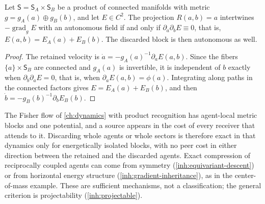 Let $\mathsf S=\mathsf S_A\times\mathsf S_B$ be a product of connected
manifolds with metric $g=g_A(a)\oplus g_B(b)$, and let $E\in C^2$. The
projection $R(a,b)=a$ intertwines $-\operatorname{grad}_gE$ with an
autonomous field if and only if $\partial_a\partial_bE\equiv0$, that is,
$E(a,b)=E_A(a)+E_B(b)$. The discarded block is then autonomous as well.
\begin{proof}
The retained velocity is $\dot a=-g_A(a)^{-1}\partial_aE(a,b)$. Since the
fibers $\{a\}\times\mathsf S_B$ are connected and $g_A(a)$ is invertible,
it is independent of $b$ exactly when $\partial_b\partial_aE=0$, that is,
when $\partial_aE(a,b)=\phi(a)$. Integrating along paths in the connected
factors gives $E=E_A(a)+E_B(b)$, and then
$\dot b=-g_B(b)^{-1}\partial_bE_B(b)$.
\end{proof}

The Fisher flow of \cref{ch:dynamics} with product recognition has
agent-local metric blocks and one potential, and a source appears in the
cost of every receiver that attends to it. Discarding whole agents or whole
sectors is therefore exact in that dynamics only for energetically isolated
blocks, with no peer cost in either direction between the retained and the
discarded agents. Exact compression of reciprocally coupled agents can come
from symmetry (\cref{inh:equivariant-descent}) or from horizontal energy
structure (\cref{inh:gradient-inheritance}), as in the center-of-mass example.
These are sufficient mechanisms, not a classification; the general criterion
is projectability (\cref{inh:projectable}).

